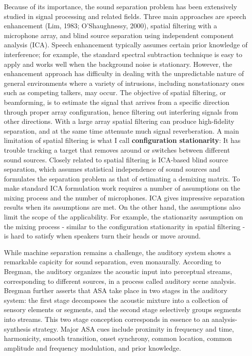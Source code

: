 \documentclass{article}
\begin{document}
Because of its importance, the sound separation problem has been extensively studied in signal processing and related fields. Three main approaches are speech enhancement (Lim, 1983; O'Shaughnessy, 2000), spatial filtering with a microphone array, and blind source separation using independent component analysis (ICA). Speech enhancement typically assumes certain prior knowledge of interference; for example, the standard spectral subtraction technique is easy to apply and works well when the background noise is stationary. However, the enhancement approach has difficulty in dealing with the unpredictable nature of general environments where a variety of intrusions, including nonstationary ones such as competing talkers, may occur. The objective of spatial filtering, or beamforming, is to estimate the signal that arrives from a specific direction through proper array configuration, hence filtering out interfering signals from other directions. With a large array spatial filtering can produce high-fidelity separation, and at the same time attenuate much signal reverberation. A main limitation of spatial filtering is what I call \textbf{configuration stationarity}: It has trouble tracking a target that removes around or switches between different sound sources. Closely related to spatial filtering is ICA-based blind source separation, which assumes statistical independence of sound sources and formulates the separation problem as that of estimating a demixing matrix. To make standard ICA formulation work requires a number of assumptions on the mixing process and the number of microphones. ICA gives impressive separation results when its assumptions are met. On the other hand, the assumptions also limit the scope of the applicability. For example, the stationarity assumption on the mixing process - similar to the configuration stationarity in spatial filtering - is hard to satisfy when speakers turn their heads or move around.

While machine separation remains a challenge, the auditory system shows a remarkable capicity for sound separation, even monaurally. According to Bregman, the auditory organizes the acoustic input into perceptual streams, corresponding to different sources, in a process called auditory scene analysis. Bregman further asserts that ASA take place in two stages in the auditory system: the first stage decomposes the acoustic mixture into a collection of sensory elements or segments, and the second stage selectively groups segments into streams. This two stage conception corresponds in essence to an analysis-synthesis strategy. Major ASA cues include proximity in frequency and time, harmonicity, smooth transition, onset synchrony, common location, common amplitude and frequency modulation, and prior knowledge.
\end{document}

